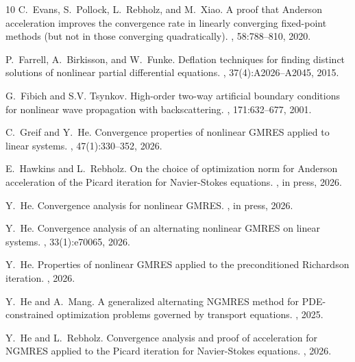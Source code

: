 \documentclass{article}
\numberwithin{equation}{section}
\begin{document}
\begin{thebibliography}{10}
C.~Evans, S.~Pollock, L.~Rebholz, and M.~Xiao.
\newblock A proof that {A}nderson acceleration improves the convergence rate in
  linearly converging fixed-point methods (but not in those converging
  quadratically).
, 58:788--810, 2020.

P.~Farrell, A.~Birkisson, and W.~Funke.
\newblock Deflation techniques for finding distinct solutions of nonlinear
  partial differential equations.
, 37(4):A2026--A2045, 2015.

G.~Fibich and S.V. Tsynkov.
\newblock High-order two-way artificial boundary conditions for nonlinear wave
  propagation with backscattering.
, 171:632--677, 2001.

C.~Greif and Y.~He.
\newblock Convergence properties of nonlinear {GMRES} applied to linear
  systems.
,
  47(1):330--352, 2026.

E.~Hawkins and L.~Rebholz.
\newblock On the choice of optimization norm for {A}nderson acceleration of the
  {P}icard iteration for {N}avier-{S}tokes equations.
, in press,
  2026.

Y.~He.
\newblock Convergence analysis for nonlinear {GMRES}.
, in press, 2026.

Y.~He.
\newblock Convergence analysis of an alternating nonlinear {GMRES} on linear
  systems.
, 33(1):e70065, 2026.

Y.~He.
\newblock Properties of nonlinear {GMRES} applied to the preconditioned
  {R}ichardson iteration.
, 2026.

Y.~He and A.~Mang.
\newblock A generalized alternating {NGMRES} method for {PDE}-constrained
  optimization problems governed by transport equations.
, 2025.

Y.~He and L.~Rebholz.
\newblock Convergence analysis and proof of acceleration for {NGMRES} applied
  to the {P}icard iteration for {N}avier-{S}tokes equations.
, 2026.


\end{thebibliography}
\end{document}
